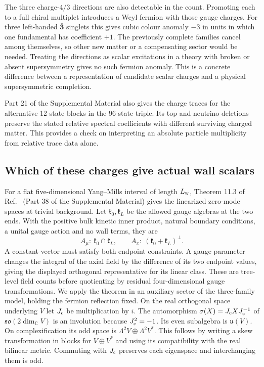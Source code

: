 \documentclass[aps,prd,reprint,onecolumn,nofootinbib,amsmath,amssymb]{revtex4-2}
\begin{document}
The three charge-$4/3$ directions are also detectable in the count. Promoting each to a full chiral multiplet introduces a Weyl fermion with those gauge charges. For three left-handed $\bar{\mathbf3}$ singlets this gives cubic colour anomaly $-3$ in units in which one fundamental has coefficient $+1$. The previously complete families cancel among themselves, so other new matter or a compensating sector would be needed. Treating the directions as scalar excitations in a theory with broken or absent supersymmetry gives no such fermion anomaly. This is a concrete difference between a representation of candidate scalar charges and a physical supersymmetric completion.

Part 21 of the Supplemental Material also gives the charge traces for the alternative 12-state blocks in the 96-state triple. Its top and neutrino deletions preserve the stated relative spectral coefficients with different surviving charged matter. This provides a check on interpreting an absolute particle multiplicity from relative trace data alone.

\subsection{Which of these charges give actual wall scalars}
For a flat five-dimensional Yang--Mills interval of length $L_{\rm w}$, Theorem 11.3 of Ref.~\cite{realnote} (Part 38 of the Supplemental Material) gives the linearized zero-mode spaces at trivial background. Let $\mathfrak k_0,\mathfrak k_L$ be the allowed gauge algebras at the two ends. With the positive bulk kinetic inner product, natural boundary conditions, a unital gauge action and no wall terms, they are
\begin{equation}
 A_\mu:\ \mathfrak k_0\cap\mathfrak k_L,\qquad
 A_x:\ (\mathfrak k_0+\mathfrak k_L)^\perp .
\end{equation}
A constant vector must satisfy both endpoint constraints. A gauge parameter changes the integral of the axial field by the difference of its two endpoint values, giving the displayed orthogonal representative for its linear class. These are tree-level field counts before quotienting by residual four-dimensional gauge transformations. We apply the theorem in an auxiliary sector of the three-family model, holding the fermion reflection fixed. On the real orthogonal space underlying $V$ let $J_{\rm c}$ be multiplication by $i$. The automorphism $\sigma(X)=J_{\rm c}XJ_{\rm c}^{-1}$ of $\mathfrak{so}(2\dim_{\mathbb C} V)$ is an involution because $J_{\rm c}^2=-1$. Its even subalgebra is $\mathfrak u(V)$. On complexification its odd space is $\Lambda^2 V\oplus\Lambda^2 V^*$. This follows by writing a skew transformation in blocks for $V\oplus V^*$ and using its compatibility with the real bilinear metric. Commuting with $J_{\rm c}$ preserves each eigenspace and interchanging them is odd.
\end{document}
